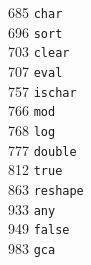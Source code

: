 \begin{footnotesize}
\begin{multicols}{3}
\vspace{-.153cm} 685   \hspace{.2cm} {\tt char                }     \\ %
\vspace{-.153cm} 696   \hspace{.2cm} {\tt sort                }     \\ %
\vspace{-.153cm} 703   \hspace{.2cm} {\tt clear               }     \\ %
\vspace{-.153cm} 707   \hspace{.2cm} {\tt eval                }     \\ %
\vspace{-.153cm} 757   \hspace{.2cm} {\tt ischar              }     \\ %
\vspace{-.153cm} 766   \hspace{.2cm} {\tt mod                 }     \\ %
\vspace{-.153cm} 768   \hspace{.2cm} {\tt log                 }     \\ %
\vspace{-.153cm} 777   \hspace{.2cm} {\tt double              }     \\ %
\vspace{-.153cm} 812   \hspace{.2cm} {\tt true                }     \\ %
\vspace{-.153cm} 863   \hspace{.2cm} {\tt reshape             }     \\ %
\vspace{-.153cm} 933   \hspace{.2cm} {\tt any                 }     \\ %
\vspace{-.153cm} 949   \hspace{.2cm} {\tt false               }     \\ %
\vspace{-.153cm} 983   \hspace{.2cm} {\tt gca                 }     \\ %

\end{multicols}
\end{footnotesize}
